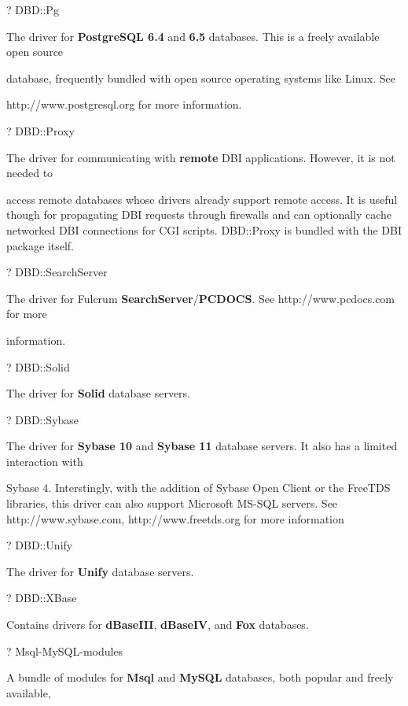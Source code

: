 \documentclass[a4paper,11pt]{book}
\begin{document}
\noindent 

\noindent ? DBD::Pg

\noindent The driver for \textbf{PostgreSQL 6.4 }and \textbf{6.5 }databases. This is a freely available open source

\noindent database, frequently bundled with open source operating systems like Linux. See

\noindent http://www.postgresql.org for more information.

\noindent 

\noindent ? DBD::Proxy

\noindent The driver for communicating with \textbf{remote }DBI applications. However, it is not needed to

\noindent access remote databases whose drivers already support remote access. It is useful though for propagating DBI requests through firewalls and can optionally cache networked DBI connections for CGI scripts. DBD::Proxy is bundled with the DBI package itself.

\noindent 

\noindent 

\noindent ? DBD::SearchServer

\noindent The driver for Fulcrum \textbf{SearchServer}/\textbf{PCDOCS}.  See http://www.pcdocs.com for more

\noindent information.

\noindent ? DBD::Solid

\noindent The driver for \textbf{Solid }database servers.

\noindent ? DBD::Sybase

\noindent The driver for \textbf{Sybase 10 }and \textbf{Sybase 11 }database servers. It also has a limited interaction with

\noindent Sybase 4. Interstingly, with the addition of Sybase Open Client or the FreeTDS libraries, this driver can also support Microsoft MS-SQL servers. See http://www.sybase.com, http://www.freetds.org for more information

\noindent ? DBD::Unify

\noindent The driver for \textbf{Unify }database servers.

\noindent ? DBD::XBase

\noindent Contains drivers for \textbf{dBaseIII}, \textbf{dBaseIV}, and \textbf{Fox }databases.

\noindent ? Msql-MySQL-modules

\noindent A  bundle of modules for \textbf{Msql  }and  \textbf{MySQL  }databases,  both  popular  and  freely  available,
\end{document}
